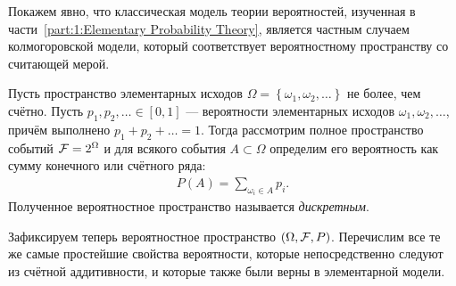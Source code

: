 \documentclass[../main.tex]{subfiles}
\begin{document}
Покажем явно, что классическая модель теории вероятностей, изученная в части~\ref{part:1:Elementary Probability Theory}, является частным случаем колмогоровской модели, который соответствует вероятностному пространству со считающей мерой.

\begin{exmpl}
 Пусть пространство элементарных исходов $\Omega = \left\{ \omega_1, \omega_2, \ldots \right\}$ не более, чем счётно. Пусть $p_1, p_2, \ldots \in [0,1]$ --- вероятности элементарных исходов $\omega_1, \omega_2, \ldots$, причём выполнено $p_1 + p_2 + \ldots  = 1$. Тогда рассмотрим полное пространство событий $\mathcal F = 2^{\Omega}$ и для всякого события $A \subset \Omega$ определим его вероятность как сумму конечного или счётного ряда:
 \begin{align*}
  P(A) = \sum_{\omega_i \in A} p_i.
 \end{align*} Полученное вероятностное пространство называется \textit{дискретным}.
\end{exmpl}

Зафиксируем теперь вероятностное пространство $(\Omega, \mathcal F, P)$. Перечислим все те же самые простейшие свойства вероятности, которые непосредственно следуют из счётной аддитивности, и которые также были верны в элементарной модели.
\end{document}
